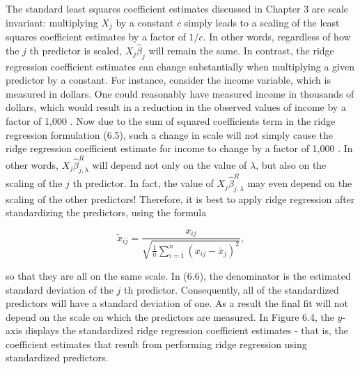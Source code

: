 \documentclass[10pt]{article}
\begin{document}
The standard least squares coefficient estimates discussed in Chapter 3 are scale invariant: multiplying $X_{j}$ by a constant $c$ simply leads to a scaling of the least squares coefficient estimates by a factor of $1 / c$. In other words, regardless of how the $j$ th predictor is scaled, $X_{j} \hat{\beta}_{j}$ will remain the same. In contrast, the ridge regression coefficient estimates can change substantially when multiplying a given predictor by a constant. For instance, consider the income variable, which is measured in dollars. One could reasonably have measured income in thousands of dollars, which would result in a reduction in the observed values of income by a factor of 1,000 . Now due to the sum of squared coefficients term in the ridge regression formulation (6.5), such a change in scale will not simply cause the ridge regression coefficient estimate for income to change by a factor of 1,000 . In other words, $X_{j} \hat{\beta}_{j, \lambda}^{R}$ will depend not only on the value of $\lambda$, but also on the scaling of the $j$ th predictor. In fact, the value of $X_{j} \hat{\beta}_{j, \lambda}^{R}$ may even depend on the scaling of the other predictors! Therefore, it is best to apply ridge regression after standardizing the predictors, using the formula


\begin{equation*}
\tilde{x}_{i j}=\frac{x_{i j}}{\sqrt{\frac{1}{n} \sum_{i=1}^{n}\left(x_{i j}-\bar{x}_{j}\right)^{2}}}, \tag{6.6}
\end{equation*}


so that they are all on the same scale. In (6.6), the denominator is the estimated standard deviation of the $j$ th predictor. Consequently, all of the standardized predictors will have a standard deviation of one. As a result the final fit will not depend on the scale on which the predictors are measured. In Figure 6.4, the $y$-axis displays the standardized ridge regression coefficient estimates - that is, the coefficient estimates that result from performing ridge regression using standardized predictors.
\end{document}
